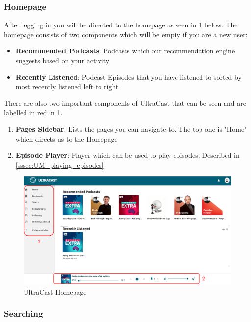 \documentclass[../report.tex]{subfiles}
\begin{document}
\newpage

\subsubsection{Homepage}

After logging in you will be directed to the homepage as seen in \cref{fig:UM_Homepage} below. The 
homepage consists of two components \underline{which will be empty if you are a new user}:
%
\begin{itemize}
    \item \textbf{Recommended Podcasts}: Podcasts which our recommendation engine suggests based on your activity
    \item \textbf{Recently Listened}: Podcast Episodes that you have listened to sorted by most recently listened left to right
\end{itemize}
%
There are also two important components of UltraCast that can be seen and are labelled in red in \cref{fig:UM_Homepage}.
\begin{enumerate}
    \item \textbf{Pages Sidebar}: Lists the pages you can navigate to. The top one is "Home" which directs us to the Homepage
    \item \textbf{Episode Player}: Player which can be used to play episodes. Described in \cref{sssec:UM_playing_episodes}
\end{enumerate}

\begin{figure}[ht] 
    \centering
    \includegraphics[width=16cm]{resources/UM_Homepage}
    \caption{UltraCast Homepage}
    \label{fig:UM_Homepage} 
\end{figure}

\subsubsection{Searching}
\end{document}
